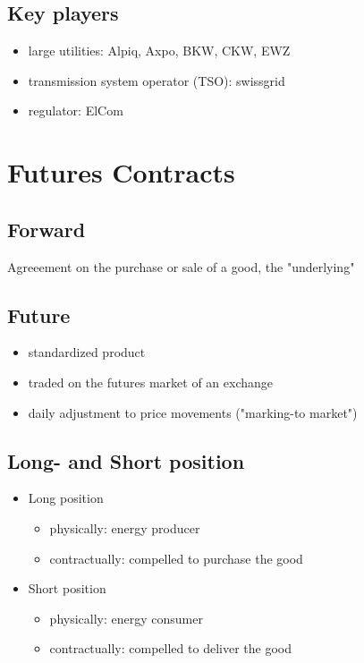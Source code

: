 \documentclass[fs, footer]{latex4ei}
\begin{document}
\begin{multicols*}{4}
  \subsection*{Key players}
  \begin{itemize}
  	\item large utilities: Alpiq, Axpo, BKW, CKW, EWZ
  	\item transmission system operator (TSO): swissgrid
  	\item regulator: ElCom
  \end{itemize} 
\section{Futures Contracts}

\subsection*{Forward}
Agreeement on the purchase or sale of a good, the "underlying"

\subsection*{Future}
\begin{itemize}
  	\item standardized product
  	\item traded on the futures market of an exchange
  	\item daily adjustment to price movements ("marking-to market")
  \end{itemize}  

 \subsection*{Long- and Short position}
 \begin{itemize}
 	\item Long position
 	\begin{itemize}
 		\item physically: energy producer
 		\item contractually: compelled to purchase the good
 	\end{itemize}
 	\item Short position
 	 \begin{itemize}
 		\item physically: energy consumer
 		\item contractually: compelled to deliver the good
 	\end{itemize}
 \end{itemize}


\end{multicols*}
\end{document}
